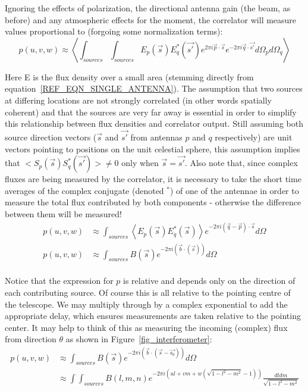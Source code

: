 Ignoring the effects of polarization, the directional antenna gain (the beam, as before) and any atmospheric effects
for the moment, the correlator will measure values proportional to (forgoing some normalization terms):
\begin{equation*}
    p(u,v,w) \approx \left<\int_{sources}\int_{sources}{E_p(\vec{s})E_q^*(\vec{s'})e^{2\pi i\vec{p}\cdot\vec{s}}e^{-2\pi i\vec{q}\cdot\vec{s'}}d\Omega_pd\Omega_q}\right>     
\end{equation*}

Here E is the flux density over a small area (stemming directly from equation~\ref{REF_EQN_SINGLE_ANTENNA}). The assumption that two sources at differing locations are 
not strongly correlated (in other words spatially coherent) and that the sources are very far away is essential in order to simplify this relationship between flux densities 
and correlator output. Still assuming both source direction vectors ($\vec{s}$ and $\vec{s'}$ from antennas $p$ and $q$ respectively) are unit vectors pointing to positions 
on the unit celestial sphere, this assumption implies that $<S_p(\vec{s})S_q^*(\vec{s'})> \neq 0$ only when $\vec{s} = \vec{s'}$. Also note that, since complex fluxes 
are being measured by the correlator, it is necessary to take the short time averages of the complex conjugate (denoted $^{*}$)
of one of the antennae in order to measure the total flux contributed by both components - otherwise the difference between
them will be measured! 
\begin{equation*}
  \begin{split}
    p(u,v,w) &\approx \int_{sources}{\left<E_p(\vec{s})E_q^*(\vec{s})\right>e^{-2\pi i(\vec{q} - \vec{p})\cdot\vec{s}}d\Omega}\\
    p(u,v,w) &\approx \int_{sources}{B(\vec{s})e^{-2\pi i(\vec{b}\cdot(\vec{s}))}d\Omega}\\
  \end{split}
\end{equation*}

Notice that the expression for $p$ is relative and depends only on the direction of each contributing source. Of course this
is all relative to the pointing centre of the telescope. We may multiply through by a complex exponential to add the appropriate 
delay, which ensures measurements are taken relative to the pointing center. It may help to think of this as measuring the
incoming (complex) flux from direction $\theta$ as shown in Figure~\ref{fig_interferometer}:
\begin{equation}
 \label{EQN_ONE_CORR_RIME}
 \begin{split}
 p(u,v,w) &\approx \int_{sources}{B(\vec{s})e^{-2\pi i(\vec{b}\cdot(\vec{s}-\vec{s_0}))}d\Omega}\\
	  &\approx \int\int_{sources}{B(l,m,n)e^{-2\pi i(ul+vm+w(\sqrt{1-l^2-m^2}-1))}\frac{dldm}{\sqrt{1-l^2-m^2}}}\\
 \end{split}
\end{equation}

